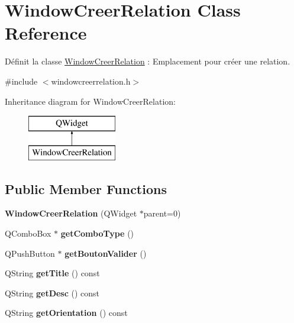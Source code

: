 \hypertarget{class_window_creer_relation}{}\section{Window\+Creer\+Relation Class Reference}
\label{class_window_creer_relation}


Définit la classe \hyperlink{class_window_creer_relation}{Window\+Creer\+Relation} \+: Emplacement pour créer une relation.  




{\ttfamily \#include $<$windowcreerrelation.\+h$>$}

Inheritance diagram for Window\+Creer\+Relation\+:\begin{figure}[H]
\begin{center}
\leavevmode
\includegraphics[height=2.000000cm]{class_window_creer_relation}
\end{center}
\end{figure}
\subsection*{Public Member Functions}
\begin{DoxyCompactItemize}
\item 
\mbox{\label{class_window_creer_relation_a89501cee057634f9618f1031df95f0ae}} 
{\bfseries Window\+Creer\+Relation} (Q\+Widget $\ast$parent=0)
\item 
\mbox{\label{class_window_creer_relation_a0e57f258b6663450dcf4f6d02ff7de36}} 
Q\+Combo\+Box $\ast$ {\bfseries get\+Combo\+Type} ()
\item 
\mbox{\label{class_window_creer_relation_a2998e87a3920cba7a56a56a590752c5d}} 
Q\+Push\+Button $\ast$ {\bfseries get\+Bouton\+Valider} ()
\item 
\mbox{\label{class_window_creer_relation_a1669245179b6b5d9509ad5080a9dcfa7}} 
Q\+String {\bfseries get\+Title} () const
\item 
\mbox{\label{class_window_creer_relation_a1b195952c535be0f539d6c7b389b8597}} 
Q\+String {\bfseries get\+Desc} () const
\item 
\mbox{\label{class_window_creer_relation_a398c516b68c1e4bab66ce341d7f7fe54}} 
Q\+String {\bfseries get\+Orientation} () const
\end{DoxyCompactItemize}


